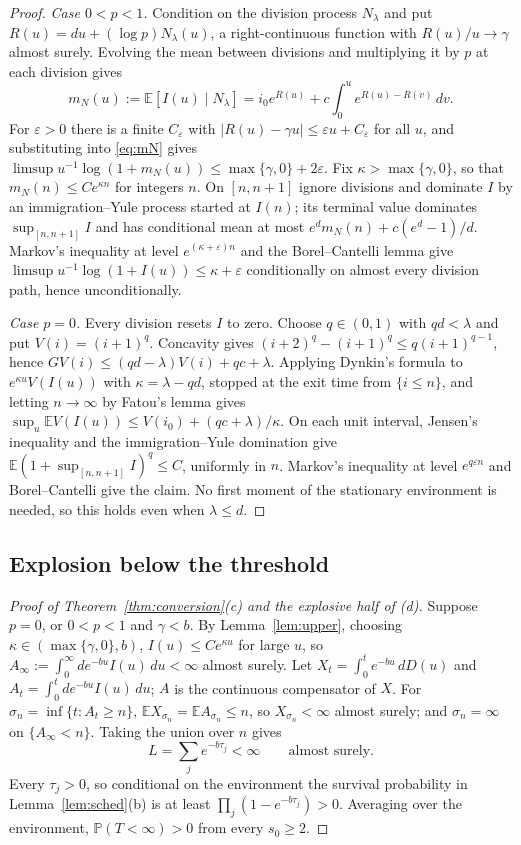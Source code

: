 \documentclass[11pt,a4paper]{article}
\numberwithin{equation}{section}
\theoremstyle{definition}\newtheorem{definition}[theorem]{Definition}
\theoremstyle{remark}\newtheorem{remark}[theorem]{Remark}\newtheorem{example}[theorem]{Example}
\newcommand{\E}{\mathbb E}
\renewcommand{\P}{\mathbb P}
\begin{document}
\begin{proof}
\emph{Case $0<p<1$.} Condition on the division process $N_\lambda$ and put $R(u)=du+(\log p)N_\lambda(u)$, a right-continuous function with $R(u)/u\to\gamma$ almost surely. Evolving the mean between divisions and multiplying it by $p$ at each division gives
\begin{equation}\label{eq:mN}
m_N(u):=\E[I(u)\mid N_\lambda]=i_0e^{R(u)}+c\int_0^ue^{R(u)-R(v)}\,dv.
\end{equation}
For $\varepsilon>0$ there is a finite $C_\varepsilon$ with $|R(u)-\gamma u|\le\varepsilon u+C_\varepsilon$ for all $u$, and substituting into \eqref{eq:mN} gives $\limsup u^{-1}\log(1+m_N(u))\le\max\{\gamma,0\}+2\varepsilon$. Fix $\kappa>\max\{\gamma,0\}$, so that $m_N(n)\le Ce^{\kappa n}$ for integers $n$. On $[n,n+1]$ ignore divisions and dominate $I$ by an immigration--Yule process started at $I(n)$; its terminal value dominates $\sup_{[n,n+1]}I$ and has conditional mean at most $e^dm_N(n)+c(e^d-1)/d$. Markov's inequality at level $e^{(\kappa+\varepsilon)n}$ and the Borel--Cantelli lemma give $\limsup u^{-1}\log(1+I(u))\le\kappa+\varepsilon$ conditionally on almost every division path, hence unconditionally.

\emph{Case $p=0$.} Every division resets $I$ to zero. Choose $q\in(0,1)$ with $qd<\lambda$ and put $V(i)=(i+1)^q$. Concavity gives $(i+2)^q-(i+1)^q\le q(i+1)^{q-1}$, hence $GV(i)\le(qd-\lambda)V(i)+qc+\lambda$. Applying Dynkin's formula to $e^{\kappa u}V(I(u))$ with $\kappa=\lambda-qd$, stopped at the exit time from $\{i\le n\}$, and letting $n\to\infty$ by Fatou's lemma gives $\sup_u\E V(I(u))\le V(i_0)+(qc+\lambda)/\kappa$. On each unit interval, Jensen's inequality and the immigration--Yule domination give $\E(1+\sup_{[n,n+1]}I)^q\le C$, uniformly in $n$. Markov's inequality at level $e^{q\varepsilon n}$ and Borel--Cantelli give the claim. No first moment of the stationary environment is needed, so this holds even when $\lambda\le d$.
\end{proof}

\subsection{Explosion below the threshold}\label{sec:explosive}
\begin{proof}[Proof of Theorem~\ref{thm:conversion}(c) and the explosive half of (d)]
Suppose $p=0$, or $0<p<1$ and $\gamma<b$. By Lemma~\ref{lem:upper}, choosing $\kappa\in(\max\{\gamma,0\},b)$, $I(u)\le Ce^{\kappa u}$ for large $u$, so $A_\infty:=\int_0^\infty de^{-bu}I(u)\,du<\infty$ almost surely. Let $X_t=\int_0^te^{-bu}\,dD(u)$ and $A_t=\int_0^tde^{-bu}I(u)\,du$; $A$ is the continuous compensator of $X$. For $\sigma_n=\inf\{t:A_t\ge n\}$, $\E X_{\sigma_n}=\E A_{\sigma_n}\le n$, so $X_{\sigma_n}<\infty$ almost surely; and $\sigma_n=\infty$ on $\{A_\infty<n\}$. Taking the union over $n$ gives
\[
L=\sum_je^{-b\tau_j}<\infty\qquad\text{almost surely}.
\]
Every $\tau_j>0$, so conditional on the environment the survival probability in Lemma~\ref{lem:sched}(b) is at least $\prod_j(1-e^{-b\tau_j})>0$. Averaging over the environment, $\P(T<\infty)>0$ from every $s_0\ge2$.
\end{proof}
\end{document}
